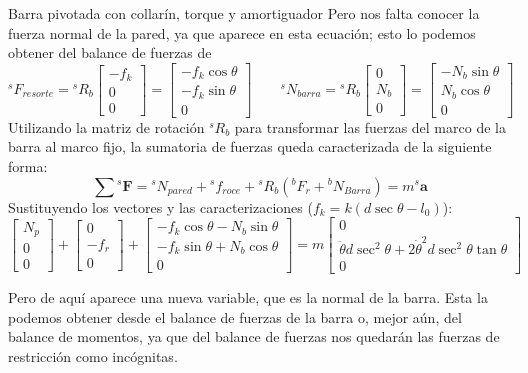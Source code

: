 \begin{solucion}{Barra pivotada con collarín, torque y amortiguador}
Pero nos falta conocer la fuerza normal de la pared, ya que aparece en esta ecuación; esto lo podemos obtener del balance de fuerzas de
$$
{}^s F_{resorte} = {}^s R_b \begin{bmatrix} -f_k \\ 0 \\ 0 \end{bmatrix} = \begin{bmatrix} -f_k \cos \theta \\ -f_k \sin \theta \\ 0 \end{bmatrix}
\qquad
{}^s N_{barra} = {}^s R_b \begin{bmatrix} 0 \\ N_b \\ 0 \end{bmatrix} = \begin{bmatrix} -N_b \sin \theta \\ N_b \cos \theta \\ 0 \end{bmatrix}
$$
Utilizando la matriz de rotación ${}^s R_b$ para transformar las fuerzas del marco de la barra al marco fijo, la sumatoria de fuerzas queda caracterizada de la siguiente forma:
$$
\sum {}^s \mathbf{F} = {}^s N_{pared} + {}^s f_{roce} + {}^s R_b ({}^b F_r + {}^b N_{Barra}) = m {}^s \mathbf{a}
$$
Sustituyendo los vectores y las caracterizaciones ($f_k = k(d \sec \theta - l_0)$):
$$
\begin{bmatrix}
    N_p \\ 0 \\ 0
\end{bmatrix} +
\begin{bmatrix}
    0 \\ -f_r \\ 0
\end{bmatrix} +
\begin{bmatrix}
    -f_k \cos \theta - N_b \sin \theta \\
    -f_k \sin \theta + N_b \cos \theta \\
    0
\end{bmatrix} =
m \begin{bmatrix}
    0 \\ \ddot{\theta} d \sec^2 \theta + 2\dot{\theta}^2 d \sec^2 \theta \tan \theta \\ 0
\end{bmatrix}
$$

Pero de aquí aparece una nueva variable, que es la normal de la barra. Esta la podemos obtener desde el balance de fuerzas de la barra o, mejor aún, del balance de momentos, ya que del balance de fuerzas nos quedarán las fuerzas de restricción como incógnitas.


\end{solucion}
